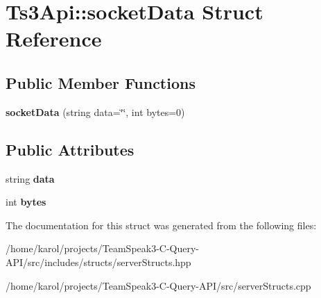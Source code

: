 \hypertarget{struct_ts3_api_1_1socket_data}{}\section{Ts3\+Api\+:\+:socket\+Data Struct Reference}
\label{struct_ts3_api_1_1socket_data}
\subsection*{Public Member Functions}
\begin{DoxyCompactItemize}
\item 
{\bfseries socket\+Data} (string data=\char`\"{}\char`\"{}, int bytes=0)\hypertarget{struct_ts3_api_1_1socket_data_a3184c40186a2ce6aabc28e2c33e1cc2d}{}\label{struct_ts3_api_1_1socket_data_a3184c40186a2ce6aabc28e2c33e1cc2d}

\end{DoxyCompactItemize}
\subsection*{Public Attributes}
\begin{DoxyCompactItemize}
\item 
string {\bfseries data}\hypertarget{struct_ts3_api_1_1socket_data_a63473d0fbca6614e92d80b1efde51937}{}\label{struct_ts3_api_1_1socket_data_a63473d0fbca6614e92d80b1efde51937}

\item 
int {\bfseries bytes}\hypertarget{struct_ts3_api_1_1socket_data_a0d901390d3949289f84a3bf37591454d}{}\label{struct_ts3_api_1_1socket_data_a0d901390d3949289f84a3bf37591454d}

\end{DoxyCompactItemize}


The documentation for this struct was generated from the following files\+:\begin{DoxyCompactItemize}
\item 
/home/karol/projects/\+Team\+Speak3-\/\+C-\/\+Query-\/\+A\+P\+I/src/includes/structs/server\+Structs.\+hpp\item 
/home/karol/projects/\+Team\+Speak3-\/\+C-\/\+Query-\/\+A\+P\+I/src/server\+Structs.\+cpp\end{DoxyCompactItemize}
